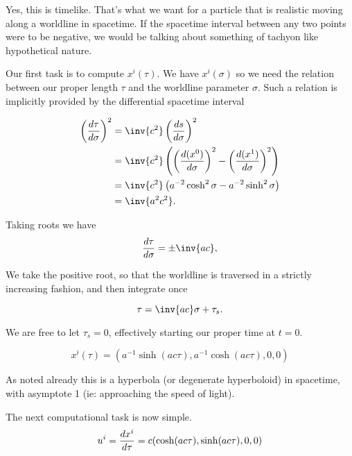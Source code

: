 Yes, this is timelike.  That's what we want for a particle that is realistic moving along a worldline in spacetime.  If the spacetime interval between any two points were to be negative, we would be talking about something of tachyon like hypothetical nature.

Our first task is to compute $x^i(\tau)$.  We have $x^i(\sigma)$ so we need the relation between our proper length $\tau$ and the worldline parameter $\sigma$.  Such a relation is implicitly provided by the differential spacetime interval

\begin{align*}
\left(\frac{d\tau}{d\sigma}\right)^2
&= \inv{c^2} \left(\frac{ds}{d\sigma}\right)^2 \\
&= \inv{c^2} \left(
\left( \frac{d(x^0)}{d\sigma}\right)^2
-\left( \frac{d(x^1)}{d\sigma}\right)^2
\right) \\
&= \inv{c^2} \left( a^{-2} \cosh^2 \sigma - a^{-2} \sinh^2 \sigma \right) \\
&= \inv{a^2 c^2}.
\end{align*}

Taking roots we have
\begin{equation}\label{eqn:relativisticElectrodynamicsT2:50}
\frac{d\tau}{d\sigma} = \pm \inv{a c},
\end{equation}

We take the positive root, so that the worldline is traversed in a strictly increasing fashion, and then integrate once

\begin{equation}\label{eqn:relativisticElectrodynamicsT2:60}
\tau = \inv{ac} \sigma + \tau_s.
\end{equation}

We are free to let $\tau_s = 0$, effectively starting our proper time at $t=0$.

\begin{equation}\label{eqn:relativisticElectrodynamicsT2:70}
x^i(\tau) = ( a^{-1} \sinh( a c \tau), a^{-1} \cosh( a c \tau ), 0, 0 )
\end{equation}

As noted already this is a hyperbola (or degenerate hyperboloid) in spacetime, with asymptote 1 (ie: approaching the speed of light).

The next computational task is now simple.
\begin{equation}\label{eqn:relativisticElectrodynamicsT2:77}
u^i
= \frac{dx^i}{d\tau} 
= c ( \cosh( a c \tau ), \sinh( a c \tau ), 0, 0) \\
\end{equation}

